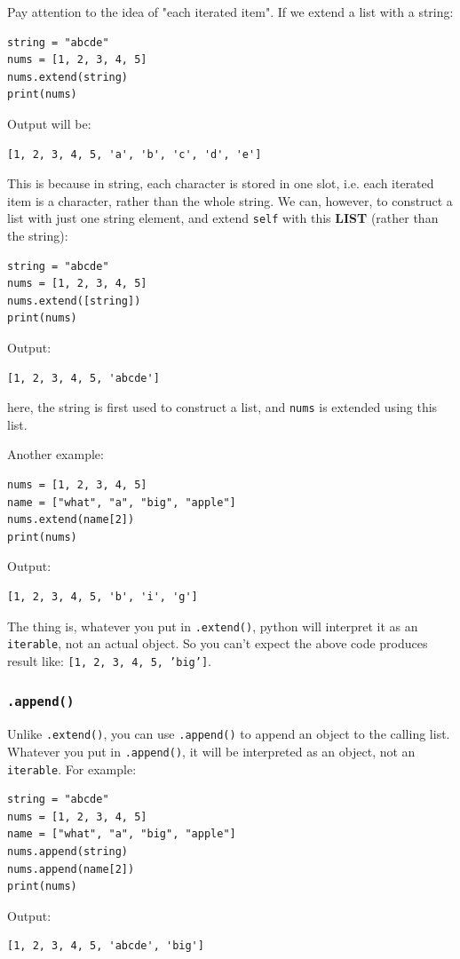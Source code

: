\documentclass[12pt]{book}
\begin{document}
Pay attention to the idea of "each iterated item". If we extend a list with a string:
\begin{verbatim}
string = "abcde"
nums = [1, 2, 3, 4, 5]
nums.extend(string)
print(nums)
\end{verbatim}
Output will be:
\begin{verbatim}
[1, 2, 3, 4, 5, 'a', 'b', 'c', 'd', 'e']
\end{verbatim}
This is because in string, each character is stored in one slot, i.e. each iterated item is a character, rather than the whole string. We can, however, to construct a list with just one string element, and extend \texttt{self} with this \textbf{LIST} (rather than the string):
\begin{verbatim}
string = "abcde"
nums = [1, 2, 3, 4, 5]
nums.extend([string])
print(nums)
\end{verbatim}
Output:
\begin{verbatim}
[1, 2, 3, 4, 5, 'abcde']
\end{verbatim}
here, the string is first used to construct a list, and \texttt{nums} is extended using this list.

Another example:
\begin{verbatim}
nums = [1, 2, 3, 4, 5]
name = ["what", "a", "big", "apple"]
nums.extend(name[2])
print(nums)
\end{verbatim}
Output:
\begin{verbatim}
[1, 2, 3, 4, 5, 'b', 'i', 'g']
\end{verbatim}
The thing is, whatever you put in \texttt{.extend()}, python will interpret it as an \texttt{iterable}, not an actual object. So you can't expect the above code produces result like: \texttt{[1, 2, 3, 4, 5, 'big']}.
\subsubsection{\texttt{.append()}}
\label{sec:orgc6d601c}
Unlike \texttt{.extend()}, you can use \texttt{.append()} to append an object to the calling list. Whatever you put in \texttt{.append()}, it will be interpreted as an object, not an \texttt{iterable}. For example:
\begin{verbatim}
string = "abcde"
nums = [1, 2, 3, 4, 5]
name = ["what", "a", "big", "apple"]
nums.append(string)
nums.append(name[2])
print(nums)
\end{verbatim}
Output:
\begin{verbatim}
[1, 2, 3, 4, 5, 'abcde', 'big']
\end{verbatim}
\end{document}
